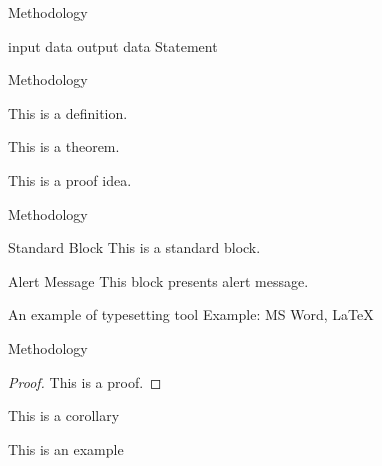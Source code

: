 \documentclass{beamer}
\begin{document}
\begin{frame}{Methodology}

\begin{algorithm}[H]
\begin{algorithmic}[1]
\REQUIRE input data
\ENSURE output data 
\STATE Statement
\ENDFOR
\end{algorithmic}
\caption{pseudocode for algorithms}
\label{alg1}
\end{algorithm}
\end{frame}


\begin{frame}{Methodology}
\begin{definition} 
        This is a definition.
    \end{definition}
    
    \begin{theorem} 
        This is a theorem. 
    \end{theorem}
    
    \begin{lemma} 
        This is a proof idea.
    \end{lemma}


\end{frame}




\begin{frame}{Methodology}
    \begin{block}{Standard Block}
        This is a standard block.
    \end{block}
    \begin{alertblock}{Alert Message}
        This block presents alert message.
    \end{alertblock}
    \begin{exampleblock}{An example of typesetting tool}
        Example: MS Word, \LaTeX{}
    \end{exampleblock}
  
\end{frame}



\begin{frame}{Methodology}
    \begin{proof} 
        This is a proof. 
    \end{proof}
    
    \begin{corollary}
        This is a corollary
    \end{corollary}
    
    \begin{example}
        This is an example 
    \end{example}
    
\end{frame}
\end{document}

